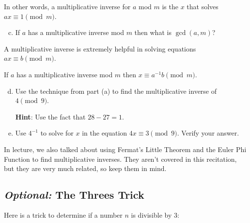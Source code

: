 \documentclass[12pt,letterpaper]{article}
\newcommand\hint[1]{\textbf{Hint}: #1}
\begin{document}
		In other words, a multiplicative inverse for $a$ mod $m$ is the $x$ that solves $ax \equiv 1 \pmod{m}$.

		\begin{enumerate}[a.]
		\setcounter{enumi}{2}
			\item If $a$ has a multiplicative inverse mod $m$ then what is $\gcd(a,m)$?
			\begin{mdframed} \vspace{1cm} \end{mdframed}

		\end{enumerate}

		A multiplicative inverse is extremely helpful in solving equations $ax \equiv b \pmod{m}$.

		If $a$ has a multiplicative inverse mod ${m}$ then $x \equiv a^{-1}b \pmod{m}$.

		
		\begin{enumerate}[a.]
					\setcounter{enumi}{3}
			\item Use the technique from part (a) to find the multiplicative inverse of $4 \pmod 9$.

			\hint Use the fact that $28 - 27 = 1$.
			
			\begin{mdframed} \vspace{3cm} \end{mdframed}

			\item Use $4^{-1}$ to solve for $x$ in the equation $4x \equiv 3 \pmod{9}$. Verify your answer.

			\begin{mdframed} \vspace{3cm} \end{mdframed}
			
		\end{enumerate}
		
		In lecture, we also talked about using Fermat's Little Theorem and the Euler Phi Function to find multiplicative inverses. They aren't covered in this recitation, but they are very much related, so keep them in mind.

\pagebreak

		\subsection*{\textit{Optional: }The Threes Trick}

		Here is a trick to determine if a number $n$ is divisible by 3:
		
\end{document}
